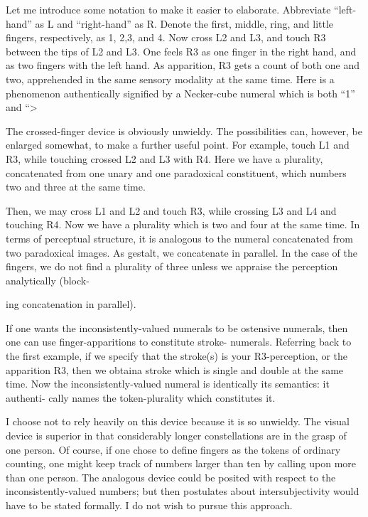 Let me introduce some notation to make it easier to elaborate. 
Abbreviate “left-hand” as L and “right-hand” as R. Denote the first, 
middle, ring, and little fingers, respectively, as 1, 2,3, and 4. Now cross 
L2 and L3, and touch R3 between the tips of L2 and L3. One feels R3 as 
one finger in the right hand, and as two fingers with the left hand. As 
apparition, R3 gets a count of both one and two, apprehended in the 
same sensory modality at the same time. Here is a phenomenon 
authentically signified by a Necker-cube numeral which is both “1” and 
“> 

The crossed-finger device is obviously unwieldy. The possibilities 
can, however, be enlarged somewhat, to make a further useful point. 
For example, touch L1 and R3, while touching crossed L2 and L3 with 
R4. Here we have a plurality, concatenated from one unary and one 
paradoxical constituent, which numbers two and three at the same 
time. 

Then, we may cross L1 and L2 and touch R3, while crossing L3 
and L4 and touching R4. Now we have a plurality which is two and 
four at the same time. In terms of perceptual structure, it is analogous 
to the numeral concatenated from two paradoxical images. As gestalt, 
we concatenate in parallel. In the case of the fingers, we do not find a 
plurality of three unless we appraise the perception analytically (block- 


ing concatenation in parallel). 

If one wants the inconsistently-valued numerals to be ostensive 
numerals, then one can use finger-apparitions to constitute stroke- 
numerals. Referring back to the first example, if we specify that the 
stroke(s) is your R3-perception, or the apparition R3, then we obtaina 
stroke which is single and double at the same time. Now the 
inconsistently-valued numeral is identically its semantics: it authenti- 
cally names the token-plurality which constitutes it. 

I choose not to rely heavily on this device because it is so unwieldy. 
The visual device is superior in that considerably longer constellations 
are in the grasp of one person. Of course, if one chose to define fingers 
as the tokens of ordinary counting, one might keep track of numbers 
larger than ten by calling upon more than one person. The analogous 
device could be posited with respect to the inconsistently-valued 
numbers; but then postulates about intersubjectivity would have to be 
stated formally. I do not wish to pursue this approach. 

